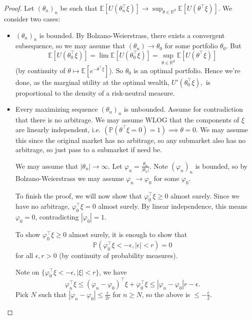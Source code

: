 \documentclass{article}
\theoremstyle{definition}
\begin{document}
\begin{proof}
    Let $(\theta_n)_n$ be such that $\mathbb{E}[U(\theta^\top_n \xi)] \to \sup_{\theta \in \mathbb{R}^d} \mathbb{E}[U(\theta^\top \xi)]$. We consider two cases:
    \begin{itemize}
        \item $(\theta_n)_n$ is bounded. By Bolzano-Weierstrass, there exists a convergent subsequence, so we may assume that $(\theta_n) \to \theta_0$ for some portfolio $\theta_0$. But $$\mathbb{E}[U(\theta_0^\top \xi)] = \lim \mathbb{E}[U(\theta_0^\top \xi)] = \sup_{\theta \in \mathbb{R}^d} \mathbb{E}[U(\theta^\top \xi)]$$ (by continuity of $\theta \mapsto \mathbb{E}[e^{-\theta^\top\xi}]$). So $\theta_0$ is an optimal portfolio. Hence we're done, as the marginal utility at the optimal wealth, $U'(\theta_0^\top \xi),$ is proportional to the density of a risk-neutral measure.
        \item Every maximizing sequence $(\theta_n)_n$ is unbounded. Assume for contradiction that there is no arbitrage. We may assume WLOG that the components of $\xi$ are linearly independent, i.e. $(\mathbb{P}(\theta^\top \xi = 0)=1) \implies \theta = 0$. We may assume this since the original market has no arbitrage, so any submarket also has no arbitrage, so just pass to a submarket if need be.
        \vspace{1mm}
        
        We may assume that $|\theta_n| \to \infty$. Let $\varphi_n = \frac{\theta_n}{|\theta_n|}$. Note $(\varphi_n)_n$ is bounded, so by Bolzano-Weierstrass we may assume $\varphi_n \to \varphi_0$ for some $\varphi_0$.

        To finish the proof, we will now show that $\varphi_0^\top \xi \ge 0$ almost surely. Since we have no arbitrage, $\varphi_0^\top\xi=0$ almost surely. By linear independence, this means $\varphi_0 = 0$, contradicting $|\varphi_0|=1$.
        \vspace{1mm}
        
        To show $\varphi_0^\top \xi \ge 0$ almost surely, it is enough to show that $$\mathbb{P}(\varphi_0^\top \xi < -\epsilon, |\epsilon|<r)=0$$ for all $\epsilon,r>0$ (by continuity of probability measures).
        \vspace{1mm}
        
        Note on $\{\varphi_0^\top \xi < -\epsilon, |\xi|<r\}$, we have \[
        \varphi_n^\top \xi \le (\varphi_n-\varphi_0)^\top \xi + \varphi_0^\top \xi \le |\varphi_n-\varphi_0|r - \epsilon.
        \]
        Pick $N$ such that $|\varphi_n-\varphi_0|\le \frac{\epsilon}{2r}$ for $n\ge N$, so the above is $\le -\frac{\epsilon}{2}$.
        \vspace{1mm}
        

\end{itemize}
\end{proof}
\end{document}
